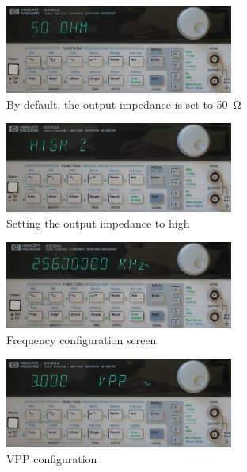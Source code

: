 \begin{figure}
    \centering
    \includegraphics[width=0.67\textwidth]{images/funcGen/funcGen-04.jpg}
    \caption{By default, the output impedance is set to \SI{50}{\ohm}}
    \label{fig:HPwave:50Ohm}
\end{figure}

\begin{figure}
    \centering
    \includegraphics[width=0.67\textwidth]{images/funcGen/funcGen-05.jpg}
    \caption{Setting the output impedance to high}
    \label{fig:HPwave:highZ}
\end{figure}

\begin{figure}
    \centering
    \includegraphics[width=0.67\textwidth]{images/funcGen/funcGen-06.jpg}
    \caption{Frequency configuration screen}
    \label{fig:HPwave:freq}
\end{figure}

\begin{figure}
    \centering
    \includegraphics[width=0.67\textwidth]{images/funcGen/funcGen-07.jpg}
    \caption{VPP configuration}
    \label{fig:HPwave:vpp}
\end{figure}

